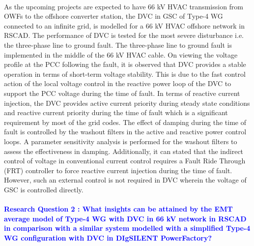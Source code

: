 \paragraph{} As the upcoming projects are expected to have 66 kV \gls{HVAC} transmission from \gls{OWF}s to the offshore converter station, the \gls{DVC} in \gls{GSC} of Type-4 \gls{WG} connected to an infinite grid, is modelled for a 66 kV \gls{HVAC} offshore network in RSCAD. The performance of \gls{DVC} is tested for the most severe disturbance i.e. the three-phase line to ground fault. The three-phase line to ground fault is implemented in the middle of the 66 kV \gls{HVAC} cable. On viewing the voltage profile at the \gls{PCC} following the fault, it is observed that \gls{DVC} provides a stable operation in terms of short-term voltage stability. This is due to the fast control action of the local voltage control in the reactive power loop of the \gls{DVC} to support the \gls{PCC} voltage during the time of fault. 
In terms of reactive current injection, the \gls{DVC} provides active current priority during steady state conditions and reactive current priority during the time of fault which is a significant requirement by most of the grid codes. The effect of damping during the time of fault is controlled by the washout filters in the active and reactive power control loops. A parameter sensitivity analysis is performed for the washout filters to assess the effectiveness in damping. Additionally, it can stated that the indirect control of voltage in conventional current control requires a Fault Ride Through (FRT) controller to force reactive current injection during the time of fault. However, such an external control is not required in \gls{DVC} wherein the voltage of \gls{GSC} is controlled directly. 

\paragraph{\textcolor{blue}{Research Question 2 : What insights can be attained by the \gls{EMT} average model of Type-4 \gls{WG} with \gls{DVC} in 66 kV network in RSCAD in comparison with a similar system modelled with a simplified Type-4 \gls{WG} configuration with \gls{DVC} in DIgSILENT PowerFactory?}}

